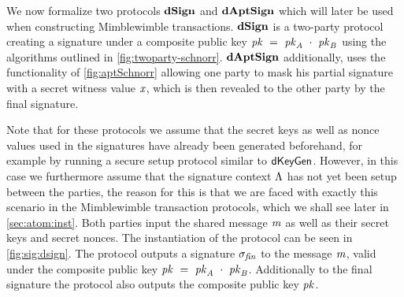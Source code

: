 We now formalize two protocols $\mathbf{dSign}$ and $\mathbf{dAptSign}$ which will later be used when constructing Mimblewimble transactions.
$\mathbf{dSign}$ is a two-party protocol creating a signature under a composite public key $\mathit{pk} ~=~ \mathit{pk}_{\mathit{A}} ~\cdot~ \mathit{pk}_{\mathit{B}}$ using the algorithms outlined in \cref{fig:twoparty-schnorr}.
$\mathbf{dAptSign}$ additionally, uses the functionality of \cref{fig:aptSchnorr} allowing one party to mask his partial signature with a secret witness value $\mathit{x}$, which is then revealed to the other party by the final signature.

Note that for these protocols we assume that the secret keys as well as nonce values used in the signatures have already been generated beforehand, for example by running a secure setup protocol similar to $\mathsf{dKeyGen}$.
However, in this case we furthermore assume that the signature context $\Lambda$ has not yet been setup between the parties, the reason for this is that we are faced with exactly this scenario in the Mimblewimble transaction protocols, which we shall see later in \cref{sec:atom:inst}.
Both parties input the shared message $\mathit{m}$ as well as their secret keys and secret nonces.
The instantiation of the protocol can be seen in \cref{fig:sig:dsign}.
The protocol outputs a signature $\sigma_{\mathit{fin}}$ to the message $\mathit{m}$, valid under the composite public key $\mathit{pk} ~=~ \mathit{pk}_{\mathit{A}} ~\cdot~ \mathit{pk}_{\mathit{B}}$.
Additionally to the final signature the protocol also outputs the composite public key $\mathit{pk}$.

